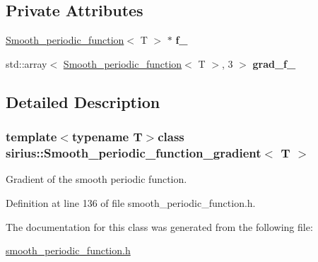 \subsection*{Private Attributes}
\begin{DoxyCompactItemize}
\item 
\hypertarget{classsirius_1_1_smooth__periodic__function__gradient_af3accc2e97b17267e7431b67a60f98e0}{}\hyperlink{classsirius_1_1_smooth__periodic__function}{Smooth\+\_\+periodic\+\_\+function}$<$ T $>$ $\ast$ {\bfseries f\+\_\+}\label{classsirius_1_1_smooth__periodic__function__gradient_af3accc2e97b17267e7431b67a60f98e0}

\item 
\hypertarget{classsirius_1_1_smooth__periodic__function__gradient_a653ae8cc3afc71b3fae053397ddf1a08}{}std\+::array$<$ \hyperlink{classsirius_1_1_smooth__periodic__function}{Smooth\+\_\+periodic\+\_\+function}$<$ T $>$, 3 $>$ {\bfseries grad\+\_\+f\+\_\+}\label{classsirius_1_1_smooth__periodic__function__gradient_a653ae8cc3afc71b3fae053397ddf1a08}

\end{DoxyCompactItemize}


\subsection{Detailed Description}
\subsubsection*{template$<$typename T$>$class sirius\+::\+Smooth\+\_\+periodic\+\_\+function\+\_\+gradient$<$ T $>$}

Gradient of the smooth periodic function. 

Definition at line 136 of file smooth\+\_\+periodic\+\_\+function.\+h.



The documentation for this class was generated from the following file\+:\begin{DoxyCompactItemize}
\item 
\hyperlink{smooth__periodic__function_8h}{smooth\+\_\+periodic\+\_\+function.\+h}\end{DoxyCompactItemize}
